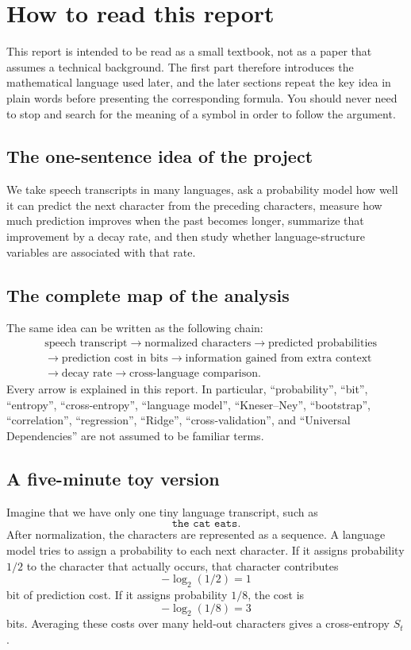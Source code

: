 \documentclass[11pt]{article}
\begin{document}
\tableofcontents
\newpage

\section{How to read this report}
This report is intended to be read as a small textbook, not as a paper that assumes a technical background. The first part therefore introduces the mathematical language used later, and the later sections repeat the key idea in plain words before presenting the corresponding formula. You should never need to stop and search for the meaning of a symbol in order to follow the argument.

\subsection*{The one-sentence idea of the project}
We take speech transcripts in many languages, ask a probability model how well it can predict the next character from the preceding characters, measure how much prediction improves when the past becomes longer, summarize that improvement by a decay rate, and then study whether language-structure variables are associated with that rate.

\subsection*{The complete map of the analysis}
The same idea can be written as the following chain:
\begin{align*}
&\text{speech transcript}
\to \text{normalized characters}
\to \text{predicted probabilities}\\
&\to \text{prediction cost in bits}
\to \text{information gained from extra context}\\
&\to \text{decay rate}
\to \text{cross-language comparison}.
\end{align*}
Every arrow is explained in this report. In particular, ``probability'', ``bit'', ``entropy'', ``cross-entropy'', ``language model'', ``Kneser--Ney'', ``bootstrap'', ``correlation'', ``regression'', ``Ridge'', ``cross-validation'', and ``Universal Dependencies'' are not assumed to be familiar terms.

\subsection*{A five-minute toy version}
Imagine that we have only one tiny language transcript, such as
\[
\texttt{the cat eats}.
\]
After normalization, the characters are represented as a sequence. A language model tries to assign a probability to each next character. If it assigns probability $1/2$ to the character that actually occurs, that character contributes
\[
-\log_2(1/2)=1
\]
bit of prediction cost. If it assigns probability $1/8$, the cost is
\[
-\log_2(1/8)=3
\]
bits. Averaging these costs over many held-out characters gives a cross-entropy $S_t$.
\end{document}
